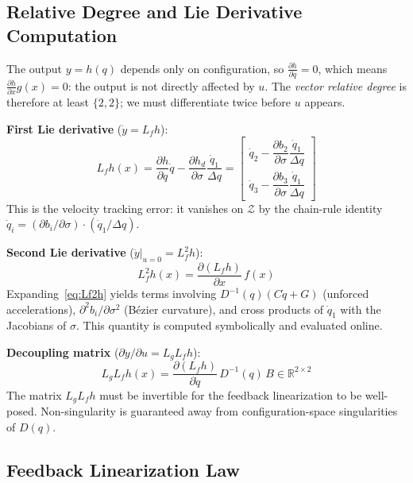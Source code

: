 \documentclass[conference]{IEEEtran}
\begin{document}
\subsection{Relative Degree and Lie Derivative Computation}

The output $y = h(q)$ depends only on configuration, so $\frac{\partial h}{\partial \dot{q}} = 0$, which means $\frac{\partial h}{\partial x} g(x) = 0$: the output is not directly affected by $u$. The \emph{vector relative degree} is therefore at least $\{2,2\}$; we must differentiate twice before $u$ appears.

\textbf{First Lie derivative} ($\dot{y} = L_f h$):
\begin{equation}
    L_f h(x) = \frac{\partial h}{\partial q}\dot{q} - \frac{\partial h_d}{\partial \sigma}\frac{\dot{q}_1}{\Delta q}
    = \begin{bmatrix} \dot{q}_2 - \dfrac{\partial b_2}{\partial \sigma} \dfrac{\dot{q}_1}{\Delta q} \\[6pt] \dot{q}_3 - \dfrac{\partial b_3}{\partial \sigma} \dfrac{\dot{q}_1}{\Delta q} \end{bmatrix} \label{eq:Lfh}
\end{equation}
This is the velocity tracking error: it vanishes on $\mathcal{Z}$ by the chain-rule identity $\dot{q}_i = (\partial b_i/\partial\sigma)\cdot(\dot{q}_1/\Delta q)$.

\textbf{Second Lie derivative} ($\ddot{y}|_{u=0} = L_f^2 h$):
\begin{equation}
    L_f^2 h(x) = \frac{\partial(L_f h)}{\partial x}\,f(x) \label{eq:Lf2h}
\end{equation}
Expanding~\eqref{eq:Lf2h} yields terms involving $D^{-1}(q)(C\dot{q}+G)$ (unforced accelerations), $\partial^2 b_i/\partial\sigma^2$ (B\'ezier curvature), and cross products of $\dot{q}_1$ with the Jacobians of $\sigma$. This quantity is computed symbolically and evaluated online.

\textbf{Decoupling matrix} ($\partial \ddot{y}/\partial u = L_g L_f h$):
\begin{equation}
    L_g L_f h(x) = \frac{\partial(L_f h)}{\partial \dot{q}}\, D^{-1}(q)\, B \in \mathbb{R}^{2\times 2} \label{eq:LgLfh}
\end{equation}
The matrix $L_g L_f h$ must be invertible for the feedback linearization to be well-posed. Non-singularity is guaranteed away from configuration-space singularities of $D(q)$.

\subsection{Feedback Linearization Law}
\end{document}
